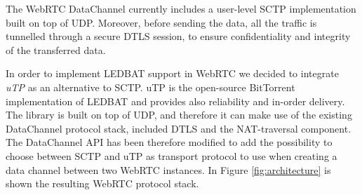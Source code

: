 \documentclass{sig-alternate}
\begin{document}

The WebRTC DataChannel currently includes a user-level SCTP implementation built on top of UDP. Moreover, before sending the data, all the traffic is tunnelled through a secure DTLS session, to ensure confidentiality and integrity of the transferred data.

In order to implement LEDBAT support in WebRTC we decided to integrate \textit{uTP} \cite{utp-repo} as an alternative to SCTP. uTP is the open-source BitTorrent implementation of LEDBAT and provides also reliability and in-order delivery. The library is built on top of UDP, and therefore it can make use of the existing DataChannel protocol stack, included DTLS and the NAT-traversal component. The DataChannel API has been therefore modified to add the possibility to choose between SCTP and uTP as transport protocol to use when creating a data channel between two WebRTC instances. In Figure \ref{fig:architecture} is shown the resulting WebRTC protocol stack.


\label{sec:architecture}


\end{document}
